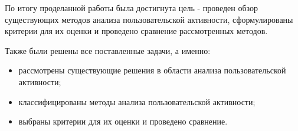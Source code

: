 По итогу проделанной работы была достигнута цель - проведен обзор существующих методов анализа пользовательской активности, сформулированы критерии для их оценки и проведено сравнение рассмотренных методов.

Также были решены все поставленные задачи, а именно:

\begin{itemize}
	\item рассмотрены существующие решения в области анализа пользовательской активности;
	\item классифицированы методы анализа пользовательской активности;
	\item выбраны критерии для их оценки и проведено сравнение.
\end{itemize}